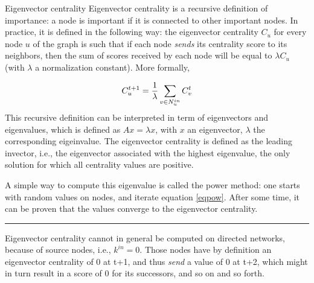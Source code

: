 \documentclass[a4paper,11pt]{book}
\begin{document}
\begin{textbox}{Eigenvector centrality}
Eigenvector centrality is a recursive definition of importance: a node is important if it is connected to other important nodes. In practice, it is defined in the following way: the eigenvector centrality $C_u$ for every node $u$ of the graph is such that if each node \textit{sends} its centrality score to its neighbors, then the sum of scores received by each node will be equal to $\lambda C_u$ (with $\lambda$ a normalization constant). More formally,

\begin{equation}
    \centering
C^{t+1}_u = \frac{1}{\lambda}\sum_{v\in N^{in}_u}C^t_v
\label{eqpow}
\end{equation}
This recursive definition can be interpreted in term of eigenvectors and eigenvalues, which is defined as $Ax=\lambda x$, with $x$ an eigenvector, $\lambda$ the corresponding eigeinvalue. The eigenvector centrality is defined as the leading invector, i.e., the eigenvector associated with the highest eigenvalue, the only solution for which all centrality values are positive.

A simple way to compute this eigenvalue is called the power method: one starts with random values on nodes, and iterate equation \ref{eqpow}. After some time, it can be proven that the values converge to the eigenvector centrality.

\noindent\rule{4cm}{0.1pt}

Eigenvector centrality cannot in general be computed on directed networks, because of source nodes, i.e., $k^{in}=0$. Those nodes have by definition an eigenvector centrality of 0 at t+1, and thus \textit{send} a value of 0 at t+2, which might in turn result in a score of 0 for its successors, and so on and so forth.


\end{textbox}
\end{document}
